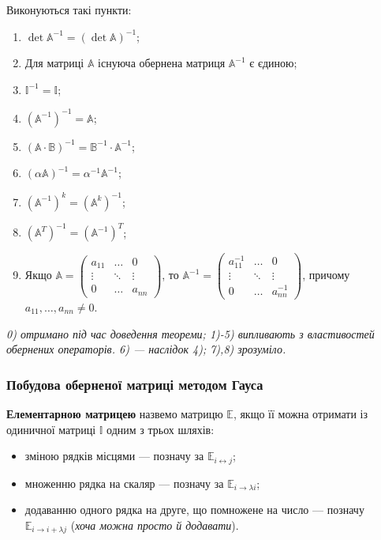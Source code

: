 \documentclass{math_library}
\begin{document}
\begin{proposition}
	Виконуються такі пункти:
	\begin{enumerate}[nosep,wide=0pt,label={\arabic*)},start=0]
	\item $\det \mathbb{A}^{-1} = (\det \mathbb{A})^{-1}$;
	\item Для матриці $\mathbb{A}$ існуюча обернена матриця $\mathbb{A}^{-1}$ є єдиною;
	\item $\mathbb{I}^{-1} = \mathbb{I}$;
	\item $(\mathbb{A}^{-1})^{-1} = \mathbb{A}$;
	\item $(\mathbb{A} \cdot \mathbb{B})^{-1} = \mathbb{B}^{-1} \cdot \mathbb{A}^{-1}$;
	\item $(\alpha \mathbb{A})^{-1} = \alpha^{-1} \mathbb{A}^{-1}$;
	\item $(\mathbb{A}^{-1})^k = (\mathbb{A}^k)^{-1}$;
	\item $(\mathbb{A}^T)^{-1} = (\mathbb{A}^{-1})^T$;
	\item Якщо $\mathbb{A} = \begin{pmatrix}
	a_{11} & \dots & 0 \\
	\vdots & \ddots & \vdots \\
	0 & \dots & a_{nn}
	\end{pmatrix}$, то $\mathbb{A}^{-1} = \begin{pmatrix}
	a_{11}^{-1} & \dots & 0 \\
	\vdots & \ddots & \vdots \\
	0 & \dots & a_{nn}^{-1}
	\end{pmatrix}$, причому $a_{11},\dots,a_{nn} \neq 0$.
	\end{enumerate}
\textit{0) отримано під час доведення теореми; 1)-5) випливають з властивостей обернених операторів. 6) --- наслідок 4); 7),8) зрозуміло.}
\end{proposition}

\subsubsection*{Побудова оберненої матриці методом Гауса}
\begin{definition}
\textbf{Елементарною матрицею} назвемо матрицю $\mathbb{E}$, якщо її можна отримати із одиничної матриці $\mathbb{I}$ одним з трьох шляхів:
\begin{itemize}[label={--}, nosep, wide=0pt]
\item зміною рядків місцями --- позначу за $\mathbb{E}_{i \leftrightarrow j}$;
\item множенню рядка на скаляр --- позначу за $\mathbb{E}_{i \rightarrow \lambda i}$;
\item додаванню одного рядка на друге, що помножене на число --- позначу $\mathbb{E}_{i \rightarrow i + \lambda j}$ (\textit{хоча можна просто й додавати}).
\end{itemize}
\end{definition}
\end{document}
